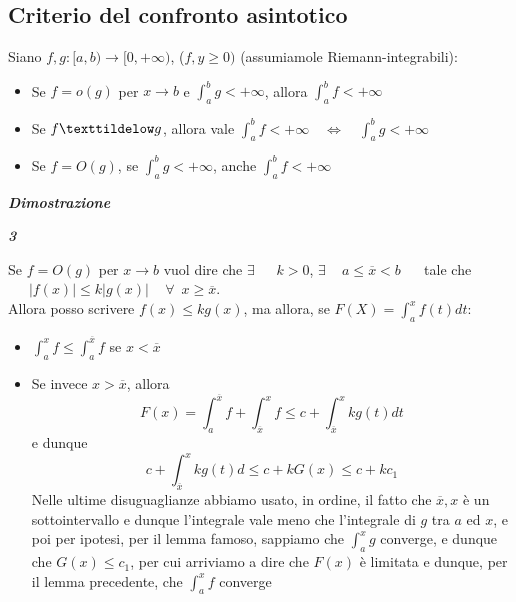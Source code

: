 \documentclass{article}
\theoremstyle{definition}
\begin{document}
\subsection{Criterio del confronto asintotico}
Siano $f,g :[a,b) \to [0,+\infty)$, ($f,y \geqslant 0)$ (assumiamole Riemann-integrabili):
\begin{itemize}
    \item Se $f=o(g)$ per $x \to b$ e $\int_a^bg < +\infty$, allora $\int_a^b f < +\infty$
    \item Se $f \texttildelow g$, allora vale $\int_a^b f < +\infty \,\,\,\,\,\, \Longleftrightarrow \,\,\,\,\,\, \int_a^b g < +\infty$
    \item Se $f=O(g)$, se $\int_a^b g < +\infty$, anche $\int_a^b f <+\infty$
\end{itemize}
\begin{center}
    \textbf{\textit{Dimostrazione}}
\end{center}
\begin{center}
    \textbf{\textit{3}}
\end{center}
Se $f=O(g)$ per $x \to b$ vuol dire che $\exists \,\,\,\,\,\,\,\,\ k > 0$, $\exists \,\,\,\,\,\,\, a \leqslant \overline{x} < b \,\,\,\,\,\,\,\,$ tale che $\,\,\,\,\,\,\,\,\,|f(x)| \leqslant k|g(x)| \,\,\,\,\,\,\, \forall \,\,\, x \geqslant \overline{x}$.
\\
Allora posso scrivere $f(x) \leqslant kg(x)$, ma allora, se $F(X)=\int_a^x f(t)dt$:
\begin{itemize}
    \item $\int_a^x f \leqslant \int_a^{\overline{x}} f$ se $x < \overline{x}$
    \item Se invece $x > \overline{x}$, allora 
    \begin{equation*}
        F(x) = \int_a^{\overline{x}}f+\int_{\overline{x}}^xf \leqslant c + \int_{\overline{x}}^x kg(t)dt
        \end{equation*}
        e dunque
        \begin{equation*}
            c+\int_{\overline{x}}^x kg(t)d \leqslant c+kG(x) \leqslant c+kc_1
        \end{equation*}
        Nelle ultime disuguaglianze abbiamo usato, in ordine, il fatto che $\overline{x},x$ è un sottointervallo e dunque l'integrale vale meno che l'integrale di $g$ tra $a$ ed $x$, e poi per ipotesi, per il lemma famoso, sappiamo che $\int_a^x g$ converge, e dunque che $G(x) \leqslant c_1$, per cui arriviamo a dire che $F(x)$ è limitata e dunque, per il lemma precedente, che $\int_a^x f$ converge
\end{itemize}
\end{document}

